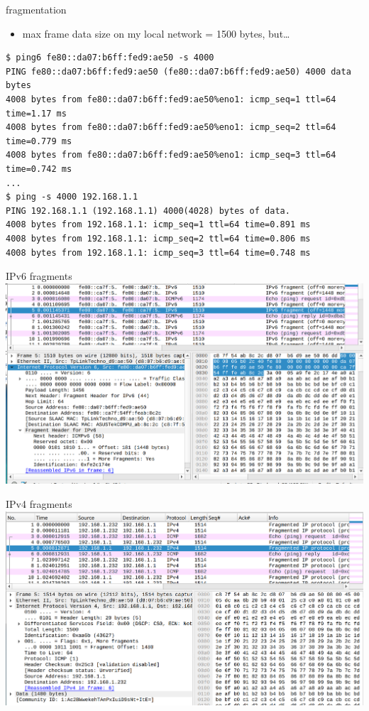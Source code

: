 \begin{frame}[fragile]{fragmentation}
\begin{itemize}
\item max frame data size on my local network = 1500 bytes, but\ldots
\end{itemize}
\begin{Verbatim}
$ ping6 fe80::da07:b6ff:fed9:ae50 -s 4000
PING fe80::da07:b6ff:fed9:ae50 (fe80::da07:b6ff:fed9:ae50) 4000 data bytes
4008 bytes from fe80::da07:b6ff:fed9:ae50%eno1: icmp_seq=1 ttl=64 time=1.17 ms
4008 bytes from fe80::da07:b6ff:fed9:ae50%eno1: icmp_seq=2 ttl=64 time=0.779 ms
4008 bytes from fe80::da07:b6ff:fed9:ae50%eno1: icmp_seq=3 ttl=64 time=0.742 ms
...
$ ping -s 4000 192.168.1.1                 
PING 192.168.1.1 (192.168.1.1) 4000(4028) bytes of data.     
4008 bytes from 192.168.1.1: icmp_seq=1 ttl=64 time=0.891 ms 
4008 bytes from 192.168.1.1: icmp_seq=2 ttl=64 time=0.806 ms 
4008 bytes from 192.168.1.1: icmp_seq=3 ttl=64 time=0.748 ms 
\end{Verbatim}
\end{frame}

\begin{frame}{IPv6 fragments}
\includegraphics[width=\textwidth]{../routing/ipv6-fragment-ex}
\end{frame}

\begin{frame}{IPv4 fragments}
\includegraphics[width=\textwidth]{../routing/ipv4-fragment-ex}
\end{frame}

